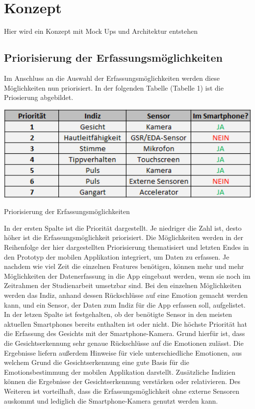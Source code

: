 \section{Konzept}
Hier wird ein Konzept mit Mock Ups und Architektur entstehen
\subsection{Priorisierung der Erfassungsmöglichkeiten}
Im Anschluss an die Auswahl der Erfassungsmöglichkeiten werden diese Möglichkeiten nun priorisiert. In der folgenden Tabelle (Tabelle 1) ist die Priosierung abgebildet. \newline
\begin{table}[h]
	\centering
	\includegraphics[width=16cm]{Bilder/prio.png}
	\caption[Priorisierung der Erfassungsmöglichkeiten]{Priorisierung der Erfassungsmöglichkeiten}
\end{table}%
\newline In der ersten Spalte ist die Priorität dargestellt. Je niedriger die Zahl ist, desto höher ist die Erfassungsmöglichkeit priorisiert. Die Möglichkeiten werden in der Reihenfolge der hier dargestellten Priorisierung thematisiert und letzten Endes in den Prototyp der mobilen Applikation integriert, um Daten zu erfassen. Je nachdem wie viel Zeit die einzelnen Features benötigen, können mehr und mehr Möglichkeiten der Datenerfassung in die App eingebaut werden, wenn sie noch im Zeitrahmen der Studienarbeit umsetzbar sind. Bei den einzelnen Möglichkeiten werden das Indiz, anhand dessen Rückschlüsse auf eine Emotion gemacht werden kann, und ein Sensor, der Daten zum Indiz für die App erfassen soll, aufgelistet. In der letzen Spalte ist festgehalten, ob der benötigte Sensor in den meisten aktuellen Smartphones bereits enthalten ist oder nicht. \newline
Die höchste Priorität hat die Erfassung des Gesichts mit der Smartphone-Kamera. Grund hierfür ist, dass die Gesichtserkennung sehr genaue Rückschlüsse auf die Emotionen zulässt. Die Ergebnisse liefern außerdem Hinweise für viele unterschiedliche Emotionen, aus welchem Grund die Gesichtserkennung eine gute Basis für die Emotionsbestimmung der mobilen Applikation darstellt. Zusätzliche Indizien können die Ergebnisse der Gesichtserkennung verstärken oder relativieren. Des Weiteren ist vorteilhaft, dass die Erfassungsmöglichkeit ohne externe Sensoren auskommt und lediglich die Smartphone-Kamera genutzt werden kann. 
